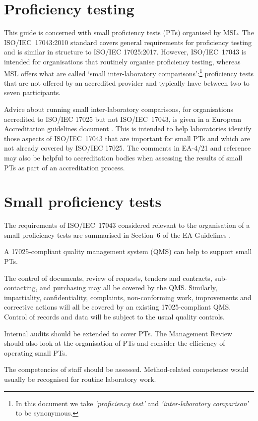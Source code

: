 \section{Proficiency testing}
This guide is concerned with small proficiency tests (PTs) organised by MSL. The ISO/IEC~17043:2010 standard covers general requirements for proficiency testing and is similar in structure to ISO/IEC 17025:2017. However, ISO/IEC~17043 is intended for organisations that routinely organise proficiency testing, whereas MSL offers what are called `small inter-laboratory comparisons':\footnote{In this document we take \textit{`proficiency test'} and \textit{`inter-laboratory comparison'} to be synonymous.} proficiency tests that are not offered by an accredited provider and typically have between two to seven participants. 

Advice about running small inter-laboratory comparisons, for organisations accredited to ISO/IEC 17025 but not ISO/IEC~17043, is given in a European Accreditation guidelines document \cite{EA-4/21}. This is intended to help laboratories identify those aspects of ISO/IEC~17043 that are important for small PTs and which are not already covered by ISO/IEC 17025. The comments in EA-4/21 and reference \cite{Milde:2020} may also be helpful to accreditation bodies when assessing the results of small PTs as part of an accreditation process.

\section{Small proficiency tests}
The requirements of ISO/IEC~17043 considered relevant to the organisation of a small proficiency tests are summarised in Section~6 of the EA Guidelines \cite{EA-4/21}.

A 17025-compliant quality management system (QMS) can help to support small PTs.

The control of documents, review of requests, tenders and contracts, sub-contacting, and purchasing may all be covered by the QMS. Similarly, impartiality, confidentiality, complaints, non-conforming work, improvements and corrective actions will all be covered by an existing 17025-compliant QMS. Control of records and data will be subject to the usual quality controls.

Internal audits should be extended to cover PTs. The Management Review should also look at the organisation of PTs and consider the efficiency of operating small PTs. 

The competencies of staff should be assessed. Method-related competence would usually be recognised for routine laboratory work.


